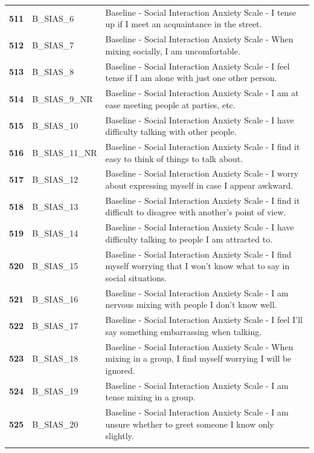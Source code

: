 \documentclass[
  letterpaper,
  DIV=11,
  numbers=noendperiod]{scrartcl}
\begin{document}
\begin{longtable}[t]{>{}cll}
\textbf{511} & B\_SIAS\_6 & Baseline - Social Interaction Anxiety Scale - I tense up if I meet an acquaintance in the street.\\
\textbf{512} & B\_SIAS\_7 & Baseline - Social Interaction Anxiety Scale - When mixing socially, I am uncomfortable.\\
\textbf{513} & B\_SIAS\_8 & Baseline - Social Interaction Anxiety Scale - I  feel tense if I am alone with just one other person.\\
\textbf{514} & B\_SIAS\_9\_NR & Baseline - Social Interaction Anxiety Scale - I am at ease meeting people at parties, etc.\\
\textbf{515} & B\_SIAS\_10 & Baseline - Social Interaction Anxiety Scale - I have difficulty talking with other people.\\
\addlinespace
\textbf{516} & B\_SIAS\_11\_NR & Baseline - Social Interaction Anxiety Scale - I find it easy to think of things to talk about.\\
\textbf{517} & B\_SIAS\_12 & Baseline - Social Interaction Anxiety Scale - I worry about expressing myself in case I appear awkward.\\
\textbf{518} & B\_SIAS\_13 & Baseline - Social Interaction Anxiety Scale - I find it difficult to disagree with another’s point of view.\\
\textbf{519} & B\_SIAS\_14 & Baseline - Social Interaction Anxiety Scale - I have difficulty talking to people I am attracted to.\\
\textbf{520} & B\_SIAS\_15 & Baseline - Social Interaction Anxiety Scale - I find myself worrying that I won’t know what to say in social situations.\\
\addlinespace
\textbf{521} & B\_SIAS\_16 & Baseline - Social Interaction Anxiety Scale - I am nervous mixing with people I don’t know well.\\
\textbf{522} & B\_SIAS\_17 & Baseline - Social Interaction Anxiety Scale - I feel I’ll say something embarrassing when talking.\\
\textbf{523} & B\_SIAS\_18 & Baseline - Social Interaction Anxiety Scale - When mixing in a group, I find myself worrying I will be ignored.\\
\textbf{524} & B\_SIAS\_19 & Baseline - Social Interaction Anxiety Scale - I  am tense mixing in a group.\\
\textbf{525} & B\_SIAS\_20 & Baseline - Social Interaction Anxiety Scale - I am unsure whether to greet someone I know only slightly.\\
\addlinespace

\end{longtable}
\end{document}
